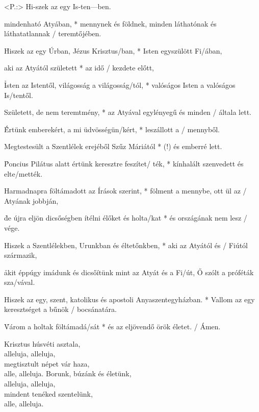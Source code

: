 \documentclass[twoside]{article}
\begin{document}


\begin{gregosheet}
  \addinline{<X-¨-----7--5----3--6---5--tT4R3-3-?,-3-4-[-,-3-£-7-5-‡-4-†-3-?,-¢-0-,-£-5-3-.}
            {   <P.:> Hi-szek az egy Is-ten---ben.}
\end{gregosheet}

\e mindenható Atyában, * mennynek és földnek, minden láthatónak és láthatatlannak / teremtőjében.

\h Hiszek az egy Úrban, Jézus Krisztus/ban, * Isten egyszülött Fi/ában,

\e aki az Atyától született * az idő / kezdete előtt,

\h Isten az Istentől, világosság a világosság/tól, * valóságos Isten a valóságos Is/tentől.

\e Született, de nem teremtmény, * az Atyával egylényegű és minden / általa lett.

\h Értünk emberekért, a mi üdvösségün/kért, * leszállott a / mennyből.

\e  Megtestesült a Szentlélek erejéből Szűz Máriától * (!) és emberré lett.

\h Poncius Pilátus alatt értünk keresztre feszítet/ ték, * kínhalált szenvedett és elte/mették.

\e Harmadnapra föltámadott az Írások szerint, * fölment a mennybe, ott ül az / Atyának jobbján,

\h de újra eljön dicsőségben ítélni élőket és holta/kat * és országának nem lesz / vége.

\e Hiszek a Szentlélekben, Urunkban és éltetőnkben, * aki az Atyától és / Fiútól származik,

\h akit éppúgy imádunk és dicsőítünk mint az Atyát és a Fi/út, Ő szólt a próféták sza/vával.

\e Hiszek az egy, szent, katolikus és apostoli Anyaszentegyházban. * Vallom az egy keresztséget a bűnök / bocsánatára.

\h Várom a holtak föltámadá/sát * és az eljövendő örök életet. / Ámen.


\begin{hymnstanzas}
  Krisztus húsvéti asztala,\\
  alleluja, alleluja,\\
  megtisztult népet vár haza,\\
  alle, alleluja.
\stanzabreak
  Borunk, búzánk és életünk,\\
  alleluja, alleluja,\\
  mindent tenéked szentelünk,\\
  alle, alleluja.
\end{hymnstanzas}
\end{document}
